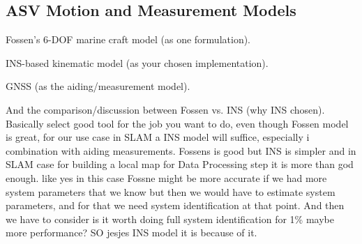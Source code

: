 \subsection{ASV Motion and Measurement Models}
Fossen’s 6-DOF marine craft model (as one formulation).

INS-based kinematic model (as your chosen implementation).

GNSS (as the aiding/measurement model).

And the comparison/discussion between Fossen vs. INS (why INS chosen).
Basically select good tool for the job you want to do, even though Fossen model is great, for our use case in SLAM a INS model will suffice, especially i combination with aiding measurements. Fossens is good but INS is simpler and in SLAM case for building a local map for Data Processing step it is more than god enough. like yes in this case Fossne might be more accurate if we had more system parameters that we know but then we would have to estimate system parameters, and for that we need system identification at that point. And then we have to consider is it worth doing full system identification for 1\% maybe more performance? SO jesjes INS model it is because of it.